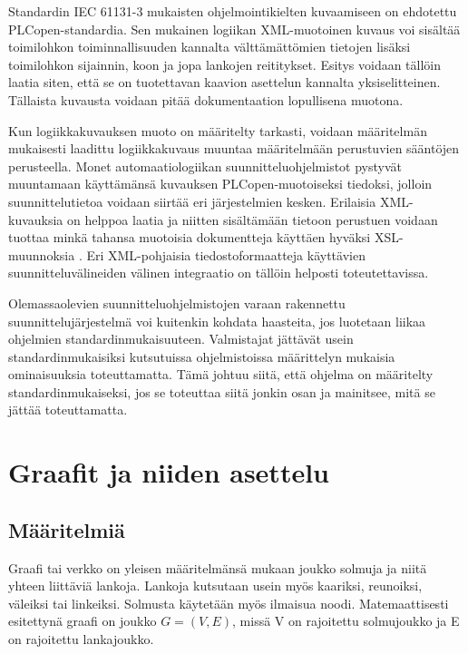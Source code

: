 \documentclass[finnish,12pt]{article}
\begin{document}
Standardin IEC 61131-3 mukaisten ohjelmointikielten kuvaamiseen on ehdotettu PLCopen-standardia.
Sen mukainen logiikan XML-muotoinen kuvaus voi sisältää toimilohkon toiminnallisuuden kannalta välttämättömien tietojen lisäksi toimilohkon sijainnin, koon ja jopa lankojen reititykset.
Esitys voidaan tällöin laatia siten, että se on tuotettavan kaavion asettelun kannalta yksiselitteinen.
Tällaista kuvausta voidaan pitää dokumentaation lopullisena muotona. \cite{RefWorks:64}

Kun logiikkakuvauksen muoto on määritelty tarkasti, voidaan määritelmän mukaisesti laadittu logiikkakuvaus muuntaa määritelmään perustuvien sääntöjen perusteella.
Monet automaatiologiikan suunnitteluohjelmistot pystyvät muuntamaan käyttämänsä kuvauksen PLCopen-muotoiseksi tiedoksi, jolloin suunnittelutietoa voidaan siirtää eri järjestelmien kesken.
Erilaisia XML-kuvauksia on helppoa laatia ja niitten sisältämään tietoon perustuen voidaan tuottaa minkä tahansa muotoisia dokumentteja käyttäen hyväksi XSL-muunnoksia \cite{RefWorks:61}. Eri XML-pohjaisia tiedostoformaatteja käyttävien suunnitteluvälineiden välinen integraatio on tällöin helposti toteutettavissa.

Olemassaolevien suunnitteluohjelmistojen varaan rakennettu suunnittelujärjestelmä voi kuitenkin kohdata haasteita, jos luotetaan liikaa ohjelmien standardinmukaisuuteen.
Valmistajat jättävät usein standardinmukaisiksi kutsutuissa ohjelmistoissa määrittelyn mukaisia ominaisuuksia toteuttamatta.
Tämä johtuu siitä, että ohjelma on määritelty standardinmukaiseksi, jos se toteuttaa siitä jonkin osan ja mainitsee, mitä se jättää toteuttamatta. \cite{RefWorks:42}


	\clearpage
		
	\section{Graafit ja niiden asettelu}

	\subsection{Määritelmiä}

Graafi tai verkko on yleisen määritelmänsä mukaan joukko solmuja ja niitä yhteen liittäviä lankoja.
Lankoja kutsutaan usein myös kaariksi, reunoiksi, väleiksi tai linkeiksi. Solmusta käytetään myös ilmaisua noodi.
Matemaattisesti esitettynä graafi on joukko $G = (V, E)$, missä V on rajoitettu solmujoukko ja E on rajoitettu lankajoukko.
\end{document}
